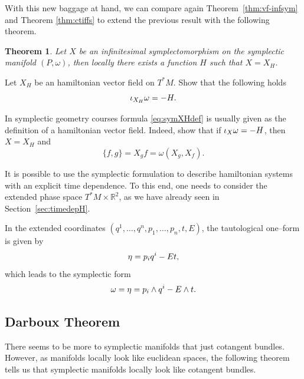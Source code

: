 \documentclass[english,fontsize=11pt,paper=a5,oneside]{scrbook}
\newcommand{\R}{\mathbb{R}}
\let\d\relax
\newcommand{\d}{\mathrm{d}}
\newtheorem{theorem}{Theorem}[chapter]
\theoremstyle{definition}
\newenvironment{example}
  {\pushQED{\qed}\renewcommand{\qedsymbol}{$\lozenge$}\examplex}
  {\popQED\endexamplex}
\newenvironment{exercise}
  {\pushQED{\qed}\renewcommand{\qedsymbol}{$\maltese$}\exercisex}
  {\popQED\endexercisex}
\begin{document}
With this new baggage at hand, we can compare again Theorem~\ref{thm:vf-infsym} and Theorem \ref{thm:ctiffs} to extend the previous result with the following theorem.

\begin{theorem}
  Let $X$ be an infinitesimal symplectomorphism on the symplectic manifold $(P,\omega)$, then locally there exists a function $H$ such that $X = X_H$.
\end{theorem}

\begin{exercise}\label{exe:altdefomega}
  Let $X_H$ be an hamiltonian vector field on $T^*M$.
  Show that the following holds
  \begin{equation}\label{eq:symXHdef}
    \iota_{X_H}\omega = -\d H.
  \end{equation}

  In symplectic geometry courses formula \eqref{eq:symXHdef} is usually given as the definition of a hamiltonian vector field.
  Indeed, show that if $\iota_{X}\omega = -\d H$, then $X=X_H$ and
  \begin{equation}
    \{f,g\} = X_g f = \omega(X_g, X_f).
  \end{equation}
\end{exercise}

\begin{example}[Time dependent hamiltonians]\label{ex:timedepH}
  It is possible to use the symplectic formulation to describe hamiltonian systems with an explicit time dependence.
  To this end, one needs to consider the extended phase space $T^*M\times\R^2$, as we have already seen in Section~\ref{sec:timedepH}.

  In the extended coordinates $(q^1, \ldots, q^n, p_1,\ldots,p_n,t,E)$, the tautological one--form is given by
  \begin{equation}
    \eta = p_i\d q^i -E\d t,
  \end{equation}
  which leads to the symplectic form
  \begin{equation}
    \omega = \d\eta = \d p_i \wedge \d q^i -\d E \wedge \d t.
  \end{equation}
\end{example}

\subsection{Darboux Theorem}

There seems to be more to symplectic manifolds that just cotangent bundles.
However, as manifolds locally look like euclidean spaces, the following theorem tells us that symplectic manifolds locally look like cotangent bundles.
\end{document}
